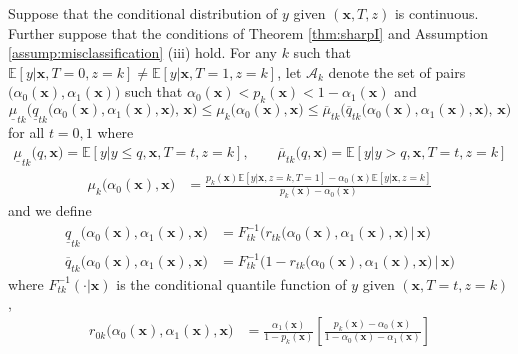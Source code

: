 \begin{thm}
  \label{thm:sharpII}
  Suppose that the conditional distribution of $y$ given $(\mathbf{x}, T,z)$ is continuous.
  Further suppose that the conditions of Theorem \ref{thm:sharpI} and Assumption \ref{assump:misclassification} (iii) hold.
  For any $k$ such that $\mathbb{E}\left[ y|\mathbf{x},T=0,z=k \right] \neq \mathbb{E}\left[ y|\mathbf{x},T=1,z=k \right]$, let $\mathcal{A}_k$ denote the set of pairs $\big(\alpha_0(\mathbf{x}), \alpha_1(\mathbf{x}) \big)$ such that  $\alpha_0(\mathbf{x}) < p_k(\mathbf{x}) < 1 -  \alpha_1(\mathbf{x})$ and
\[
  \underline{\mu}_{tk}\bigg( \underline{q}_{tk}\big( \alpha_0(\mathbf{x}), \alpha_1(\mathbf{x}), \mathbf{x}\big) , \,\mathbf{x} \bigg)\leq 
  \mu_{k}\big( \alpha_0(\mathbf{x}),\mathbf{x} \big)\leq 
  \overline{\mu}_{tk}\bigg(\overline{q}_{tk}\big( \alpha_0(\mathbf{x}), \alpha_1(\mathbf{x}), \mathbf{x}\big), \,\mathbf{x} \bigg)
\]
for all $t = 0,1$ where
\begin{align*}
  \underline{\mu}_{tk}\big( q,\mathbf{x} \big) = \mathbb{E}\left[ y\left|\right.y\leq q, \mathbf{x},T=t, z=k\right], \quad \quad
  \overline{\mu}_{tk}\big(q,\mathbf{x} \big) = \mathbb{E}\left[ y\left|\right. y > q, \mathbf{x}, T=t, z=k\right]
\end{align*}
  \begin{align*}
  \mu_k\big(\alpha_0(\mathbf{x}),\mathbf{x}\big) &= 
  \frac{p_k(\mathbf{x}) \mathbb{E}[y|\mathbf{x},z=k,T=1] - \alpha_0(\mathbf{x}) \mathbb{E}[y|\mathbf{x},z=k]}{p_k(\mathbf{x}) - \alpha_0(\mathbf{x})}
\end{align*}
and we define 
\begin{align*}
  \underline{q}_{tk}\big(\alpha_0(\mathbf{x}),\alpha_1(\mathbf{x}),\mathbf{x}\big) &= F^{-1}_{tk}\bigg(r_{tk}\big(\alpha_0(\mathbf{x}),\alpha_1(\mathbf{x}), \mathbf{x}\big)\, \bigg|\,\mathbf{x}\bigg)\\
  \overline{q}_{tk}\big(\alpha_0(\mathbf{x}),\alpha_1(\mathbf{x}),\mathbf{x}\big) &= F^{-1}_{tk}\bigg(1 - r_{tk}\big(\alpha_0(\mathbf{x}), \alpha_1(\mathbf{x}),\mathbf{x}\big) \,\bigg|\,\mathbf{x}\bigg)
\end{align*}
where $F_{tk}^{-1}(\cdot|\mathbf{x})$ is the conditional quantile function of $y$ given $(\mathbf{x},T=t,z=k)$,  
\begin{align*}
  r_{0k}\big(\alpha_0(\mathbf{x}),\alpha_1(\mathbf{x}),\mathbf{x}\big) &= \frac{\alpha_1(\mathbf{x})}{1 - p_k(\mathbf{x})} \left[ \frac{p_k(\mathbf{x}) - \alpha_0(\mathbf{x})}{1 - \alpha_0(\mathbf{x}) - \alpha_1(\mathbf{x})} \right]\\

\end{align*}
\end{thm}

